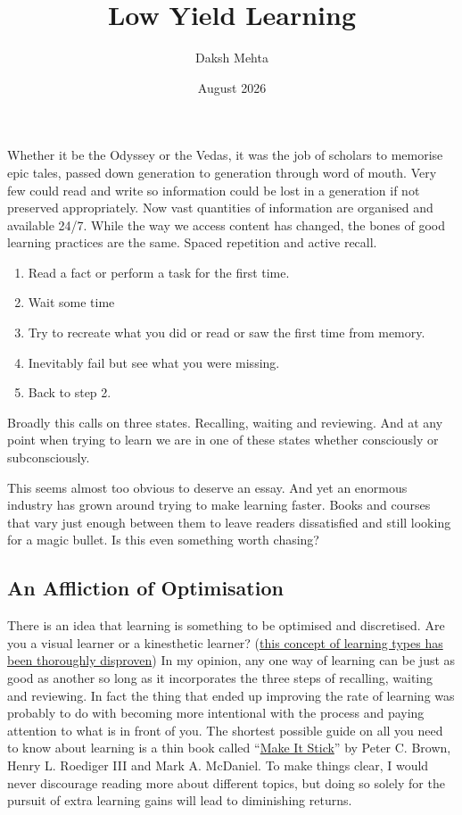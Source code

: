 \documentclass{article}
\title{Low Yield Learning}
\date{August 2026}
\author{Daksh Mehta}
\begin{document}
Whether it be the Odyssey or the Vedas, it was the job of scholars to memorise epic tales, passed down generation to generation through word of mouth. Very few could read and write so information could be lost in a generation if not preserved appropriately. Now vast quantities of information are organised and available 24/7. While the way we access content has changed, the bones of good learning practices are the same. Spaced repetition and active recall. 

\begin{enumerate}
	\item Read a fact or perform a task for the first time. 
	\item Wait some time
	\item Try to recreate what you did or read or saw the first time from memory. 
	\item Inevitably fail but see what you were missing. 
	\item Back to step 2. 
\end{enumerate}

Broadly this calls on three states. Recalling, waiting and reviewing. And at any point when trying to learn we are in one of these states whether consciously or subconsciously. 

This seems almost too obvious to deserve an essay. And yet an enormous industry has grown around trying to make learning faster. Books and courses that vary just enough between them to leave readers dissatisfied and still looking for a magic bullet. Is this even something worth chasing?  

\subsection*{An Affliction of Optimisation}

There is an idea that learning is something to be optimised and discretised. Are you a visual learner or a kinesthetic learner? (\href{https://journals.sagepub.com/doi/10.1111/j.1539-6053.2009.01038.x}{this concept of learning types has been thoroughly disproven}) In my opinion, any one way of learning can be just as good as another so long as it incorporates the three steps of recalling, waiting and reviewing. In fact the thing that ended up improving the rate of learning was probably to do with becoming more intentional with the process and paying attention to what is in front of you. The shortest possible guide on all you need to know about learning is a thin book called ``\href{https://www.makeitstick.com}{Make It Stick}'' by Peter C. Brown, Henry L. Roediger III and Mark A. McDaniel. To make things clear, I would never discourage reading more about different topics, but doing so solely for the pursuit of extra learning gains will lead to diminishing returns. 
\end{document}

